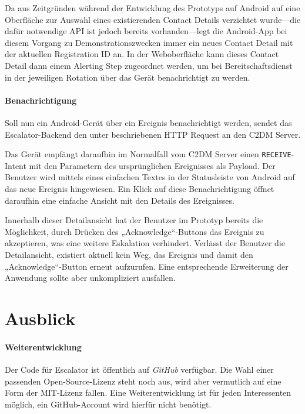 \documentclass[11pt,utf8,notoc,bibnum,german,final]{zihpub}
\begin{document}
Da aus Zeitgründen während der Entwicklung des Prototyps auf Android auf eine
Oberfläche zur Auswahl eines existierenden Contact Details verzichtet wurde—die
dafür notwendige API ist jedoch bereits vorhanden—legt die Android-App bei
diesem Vorgang zu Demonstrationszwecken immer ein neues Contact Detail mit der
aktuellen Registration ID an. In der Weboberfläche kann dieses Contact Detail
dann einem Alerting Step zugeordnet werden, um bei Bereitschaftsdienst in der
jeweiligen Rotation über das Gerät benachrichtigt zu werden.

\paragraph{Benachrichtigung}

Soll nun ein Android-Gerät über ein Ereignis benachrichtigt werden, sendet das
Escalator-Backend den unter \cite{c2dm-server} beschriebenen HTTP Request an
den C2DM Server.

Das Gerät empfängt daraufhin im Normalfall vom C2DM Server einen
\texttt{RECEIVE}-Intent mit den Parametern des ursprünglichen Ereignisses als
Payload. Der Benutzer wird mittels eines einfachen Textes in der Statusleiste
von Android auf das neue Ereignis hingewiesen. Ein Klick auf diese
Benachrichtigung öffnet daraufhin eine einfache Ansicht mit den Details des
Ereignisses.

Innerhalb dieser Detailansicht hat der Benutzer im Prototyp bereits die
Möglichkeit, durch Drücken des „Acknowledge“-Buttons das Ereignis zu
akzeptieren, was eine weitere Eskalation verhindert. Verlässt der Benutzer die
Detailansicht, existiert aktuell kein Weg, das Ereignis und damit den
„Acknowledge“-Button erneut aufzurufen. Eine entsprechende Erweiterung der
Anwendung sollte aber unkompliziert ausfallen.


\section{Ausblick}


\paragraph{Weiterentwicklung}

Der Code für Escalator ist öffentlich auf \emph{GitHub} \cite{escalator-github}
verfügbar. Die Wahl einer passenden Open-Source-Lizenz steht noch aus, wird
aber vermutlich auf eine Form der MIT-Lizenz fallen. Eine Weiterentwicklung ist
für jeden Interessenten möglich, ein GitHub-Account wird hierfür nicht benötigt.
\end{document}
